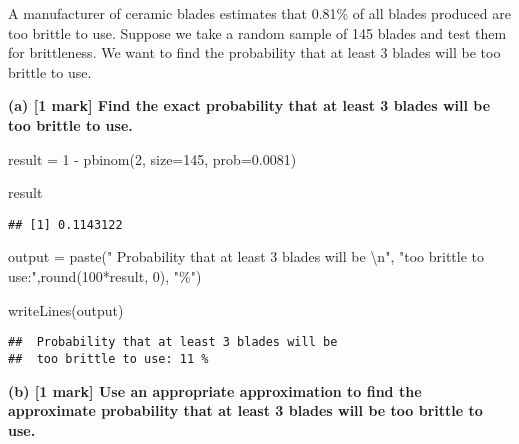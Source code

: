 \documentclass[
]{article}
\newenvironment{Shaded}{\begin{snugshade}}{\end{snugshade}}
\newcommand{\AttributeTok}[1]{\textcolor[rgb]{0.77,0.63,0.00}{#1}}
\newcommand{\DecValTok}[1]{\textcolor[rgb]{0.00,0.00,0.81}{#1}}
\newcommand{\FloatTok}[1]{\textcolor[rgb]{0.00,0.00,0.81}{#1}}
\newcommand{\FunctionTok}[1]{\textcolor[rgb]{0.00,0.00,0.00}{#1}}
\newcommand{\NormalTok}[1]{#1}
\newcommand{\OtherTok}[1]{\textcolor[rgb]{0.56,0.35,0.01}{#1}}
\newcommand{\SpecialCharTok}[1]{\textcolor[rgb]{0.00,0.00,0.00}{#1}}
\newcommand{\StringTok}[1]{\textcolor[rgb]{0.31,0.60,0.02}{#1}}
\begin{document}
A manufacturer of ceramic blades estimates that 0.81\% of all blades
produced are too brittle to use. Suppose we take a random sample of 145
blades and test them for brittleness. We want to find the probability
that at least 3 blades will be too brittle to use.

\newline
\newline

\textbf{(a) {[}1 mark{]} Find the exact probability that at least 3
blades will be too brittle to use.}

\begin{Shaded}
\begin{Highlighting}[]
\NormalTok{result }\OtherTok{=} \DecValTok{1} \SpecialCharTok{{-}} \FunctionTok{pbinom}\NormalTok{(}\DecValTok{2}\NormalTok{, }\AttributeTok{size=}\DecValTok{145}\NormalTok{, }\AttributeTok{prob=}\FloatTok{0.0081}\NormalTok{)}

\NormalTok{result}
\end{Highlighting}
\end{Shaded}

\begin{verbatim}
## [1] 0.1143122
\end{verbatim}

\begin{Shaded}
\begin{Highlighting}[]
\NormalTok{output }\OtherTok{=} \FunctionTok{paste}\NormalTok{(}\StringTok{" Probability that at least 3 blades will be }\SpecialCharTok{\textbackslash{}n}\StringTok{"}\NormalTok{, }
               \StringTok{"too brittle to use:"}\NormalTok{,}\FunctionTok{round}\NormalTok{(}\DecValTok{100}\SpecialCharTok{*}\NormalTok{result, }\DecValTok{0}\NormalTok{), }\StringTok{"\%"}\NormalTok{)}

\FunctionTok{writeLines}\NormalTok{(output)}
\end{Highlighting}
\end{Shaded}

\begin{verbatim}
##  Probability that at least 3 blades will be 
##  too brittle to use: 11 %
\end{verbatim}

\newline
\newline

\textbf{(b) {[}1 mark{]} Use an appropriate approximation to find the
approximate probability that at least 3 blades will be too brittle to
use.}
\end{document}
